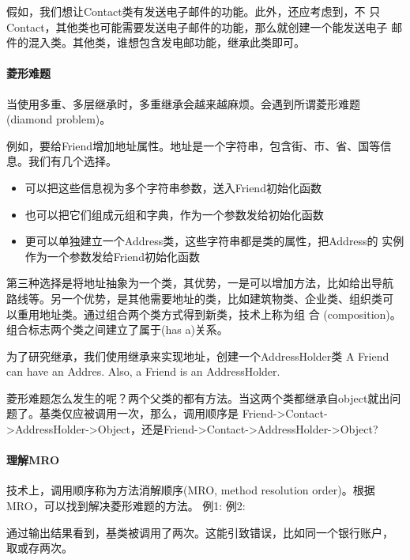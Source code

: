 假如，我们想让Contact类有发送电子邮件的功能。此外，还应考虑到，不
只Contact，其他类也可能需要发送电子邮件的功能，那么就创建一个能发送电子
邮件的混入类。其他类，谁想包含发电邮功能，继承此类即可。
\paragraph{菱形难题}
当使用多重、多层继承时，多重继承会越来越麻烦。会遇到所谓菱形难题
(diamond problem)。

例如，要给Friend增加地址属性。地址是一个字符串，包含街、市、省、国等信息。我们有几个选择。
\begin{itemize}
\item 可以把这些信息视为多个字符串参数，送入Friend初始化函数
\item 也可以把它们组成元组和字典，作为一个参数发给初始化函数
\item 更可以单独建立一个Address类，这些字符串都是类的属性，把Address的
  实例作为一个参数发给Friend初始化函数
\end{itemize}
第三种选择是将地址抽象为一个类，其优势，一是可以增加方法，比如给出导航
路线等。另一个优势，是其他需要地址的类，比如建筑物类、企业类、组织类可
以重用地址类。通过组合两个类方式得到新类，技术上称为组
合 (composition)。组合标志两个类之间建立了属于(has a)关系。

为了研究继承，我们使用继承来实现地址，创建一个AddressHolder类
A Friend can have an Addres. Also, a Friend is an AddressHolder.

菱形难题怎么发生的呢？两个父类的都有方法。当这两个类都继承自object就出问题了。基类仅应被调用一次，那么，调用顺序是
Friend->Contact->AddressHolder->Object，还是Friend->Contact->AddressHolder->Object?

\paragraph{理解MRO}
技术上，调用顺序称为方法消解顺序(MRO, method resolution order)。根据MRO，可以找到解决菱形难题的方法。
例1:
例2:

通过输出结果看到，基类被调用了两次。这能引致错误，比如同一个银行账户，
取或存两次。

